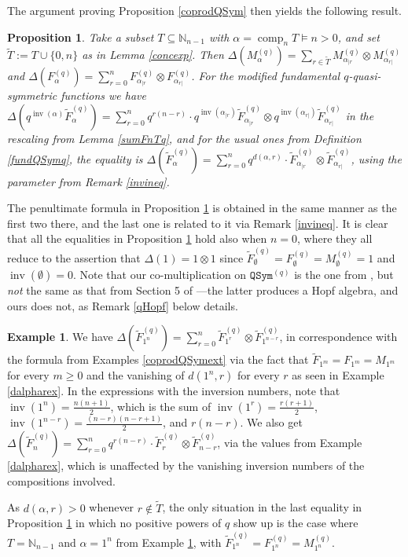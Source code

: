 \documentclass{article}
\newtheorem{prop}[thm]{Proposition}
\theoremstyle{definition}
\newtheorem{ex}[thm]{Example}
\begin{document}
The argument proving Proposition \ref{coprodQSym} then yields the following result.
\begin{prop}
Take a subset $T\subseteq\mathbb{N}_{n-1}$ with $\alpha=\operatorname{comp}_{n}T \vDash n>0$, and set $\tilde{T}:=T\cup\{0,n\}$ as in Lemma \ref{concexp}. Then $\Delta(M_{\alpha}^{(q)})=\sum_{r\in\tilde{T}}M_{\alpha_{|r}}^{(q)} \otimes M_{\alpha_{r|}}^{(q)}$ and $\Delta(F_{\alpha}^{(q)})=\sum_{r=0}^{n}F_{\alpha_{|r}}^{(q)} \otimes F_{\alpha_{r|}}^{(q)}$. For the modified fundamental $q$-quasi-symmetric functions we have $\Delta(q^{\operatorname{inv}(\alpha)}\widetilde{F}_{\alpha}^{(q)})=\sum_{r=0}^{n}q^{r(n-r)} \cdot q^{\operatorname{inv}(\alpha_{|r})}\widetilde{F}_{\alpha_{|r}}^{(q)} \otimes q^{\operatorname{inv}(\alpha_{r|})}\widetilde{F}_{\alpha_{r|}}^{(q)}$ in the rescaling from Lemma \ref{sumFnTq}, and for the usual ones from Definition \ref{fundQSymq}, the equality is $\Delta(\widetilde{F}_{\alpha}^{(q)})=\sum_{r=0}^{n}q^{d(\alpha,r)}\cdot\widetilde{F}_{\alpha_{|r}}^{(q)}\otimes\widetilde{F}_{\alpha_{r|}}^{(q)}$, using the parameter from Remark \ref{invineq}. \label{coprodQSymq}
\end{prop}
The penultimate formula in Proposition \ref{coprodQSymq} is obtained in the same manner as the first two there, and the last one is related to it via Remark \ref{invineq}. It is clear that all the equalities in Proposition \ref{coprodQSymq} hold also when $n=0$, where they all reduce to the assertion that $\Delta(1)=1\otimes1$ since $\widetilde{F}_{\emptyset}^{(q)}=F_{\emptyset}^{(q)}=M_{\emptyset}^{(q)}=1$ and $\operatorname{inv}(\emptyset)=0$. Note that our co-multiplication on $\mathtt{QSym}^{(q)}$ is the one from \cite{[L]}, but \emph{not} the same as that from Section 5 of \cite{[Ho1]}---the latter produces a Hopf algebra, and ours does not, as Remark \ref{qHopf} below details.
\begin{ex}
We have $\Delta(\widetilde{F}_{1^{n}}^{(q)})=\sum_{r=0}^{n}\widetilde{F}_{1^{r}}^{(q)}\otimes\widetilde{F}_{1^{n-r}}^{(q)}$, in correspondence with the formula from Examples \ref{coprodQSymext} via the fact that $\widetilde{F}_{1^{m}}=F_{1^{m}}=M_{1^{m}}$ for every $m\geq0$ and the vanishing of $d(1^{n},r)$ for every $r$ as seen in Example \ref{dalpharex}. In the expressions with the inversion numbers, note that $\operatorname{inv}(1^{n})=\frac{n(n+1)}{2}$, which is the sum of $\operatorname{inv}(1^{r})=\frac{r(r+1)}{2}$, $\operatorname{inv}(1^{n-r})=\frac{(n-r)(n-r+1)}{2}$, and $r(n-r)$. We also get $\Delta(\widetilde{F}_{n}^{(q)})=\sum_{r=0}^{n}q^{r(n-r)}\cdot\widetilde{F}_{r}^{(q)}\otimes\widetilde{F}_{n-r}^{(q)}$, via the values from Example \ref{dalpharex}, which is unaffected by the vanishing inversion numbers of the compositions involved. \label{DeltaQSymqext}
\end{ex}
As $d(\alpha,r)>0$ whenever $r\not\in\tilde{T}$, the only situation in the last equality in Proposition \ref{coprodQSymq} in which no positive powers of $q$ show up is the case where $T=\mathbb{N}_{n-1}$ and $\alpha=1^{n}$ from Example \ref{DeltaQSymqext}, with $\widetilde{F}_{1^{n}}^{(q)}=F_{1^{n}}^{(q)}=M_{1^{n}}^{(q)}$.
\end{document}
